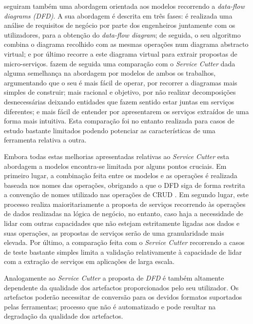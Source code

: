    

    
    \cite{chen17_dataflow_driven} seguiram também uma abordagem orientada aos modelos recorrendo a \textit{data-flow diagrams (DFD)}. A sua abordagem é descrita em três fases: é realizada uma análise de requisitos de negócio por parte dos engenheiros juntamente com os utilizadores, para a obtenção do \textit{data-flow diagram}; de seguida, o seu algoritmo combina o diagrama recolhido com as mesmas operações num diagrama abstracto virtual; e por último recorre a este diagrama virtual para extrair propostas de micro-serviços. \cite{chen17_dataflow_driven} fazem de seguida uma comparação com o \textit{Service Cutter} dada alguma semelhança na abordagem por modelos de ambos os trabalhos, argumentando que o seu é mais fácil de operar, por recorrer a diagramas mais simples de construir; mais racional e objetivo, por não realizar decomposições desnecessárias deixando entidades que fazem sentido estar juntas em serviços diferentes; e mais fácil de entender por apresentarem os serviços extraídos de uma forma mais intuitiva. Esta comparação foi no entanto realizada para casos de estudo bastante limitados podendo potenciar as características de uma ferramenta relativa a outra.
    
    Embora todas estas melhorias apresentadas relativas ao \textit{Service Cutter} esta abordagem a modelos encontra-se limitada por alguns pontos cruciais. Em primeiro lugar, a combinação feita entre os modelos e as operações é realizada baseada nos nomes das operações, obrigando a que o DFD siga de forma restrita a convenção de nomes utilizado nas operações de CRUD \citep{chen17_dataflow_driven}. Em segundo lugar, este processo realiza maioritariamente a proposta de serviços recorrendo às operações de dados realizadas na lógica de negócio, no entanto, caso haja a necessidade de lidar com outras capacidades que não estejam estritamente ligadas aos dados e suas operações, as propostas de serviços serão de uma granularidade mais elevada. Por último, a comparação feita com o \textit{Service Cutter} recorrendo a casos de teste bastante simples limita a validação relativamente à capacidade de lidar com a extração de serviços em aplicações de larga escala.
    
    Analogamente ao \textit{Service Cutter} a proposta de \textit{DFD} é também altamente dependente da qualidade dos artefactos proporcionados pelo seu utilizador. Os artefactos poderão necessitar de conversão para os devidos formatos suportados pelas ferramentas; processo que não é automatizado e pode resultar na degradação da qualidade dos artefactos.

